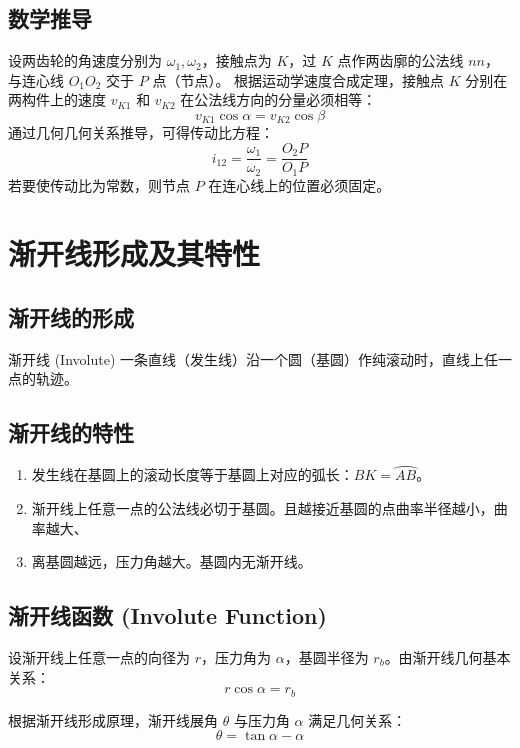 \subsection{数学推导}
设两齿轮的角速度分别为 $\omega_1, \omega_2$，接触点为 $K$，过 $K$ 点作两齿廓的公法线 $nn$，与连心线 $O_1O_2$ 交于 $P$ 点（节点）。
根据运动学速度合成定理，接触点 $K$ 分别在两构件上的速度 $v_{K1}$ 和 $v_{K2}$ 在公法线方向的分量必须相等：
\begin{equation}
	v_{K1} \cos \alpha = v_{K2} \cos \beta
\end{equation}
通过几何几何关系推导，可得传动比方程：
\begin{equation}
	i_{12} = \frac{\omega_1}{\omega_2} = \frac{O_2P}{O_1P}
\end{equation}
若要使传动比为常数，则节点 $P$ 在连心线上的位置必须固定。

\section{渐开线形成及其特性}

\subsection{渐开线的形成}
\begin{definition}{渐开线 (Involute)}
	一条直线（发生线）沿一个圆（基圆）作纯滚动时，直线上任一点的轨迹。
\end{definition}

\subsection{渐开线的特性}
\begin{enumerate}
	\item 发生线在基圆上的滚动长度等于基圆上对应的弧长：$BK = \wideparen{AB}$。
	\item 渐开线上任意一点的公法线必切于基圆。且越接近基圆的点曲率半径越小，曲率越大、
	\item 离基圆越远，压力角越大。基圆内无渐开线。
\end{enumerate}

\subsection{渐开线函数 (Involute Function)}
设渐开线上任意一点的向径为 $r$，压力角为 $\alpha$，基圆半径为 $r_b$。由渐开线几何基本关系：
\[
r \cos\alpha = r_b
\]

根据渐开线形成原理，渐开线展角 $\theta$ 与压力角 $\alpha$ 满足几何关系：
\[
\theta = \tan\alpha - \alpha
\]

